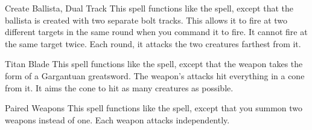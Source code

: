 \lowercase{\hypertarget{spell:Create Ballista, Dual Track}{}}\label{spell:Create Ballista, Dual Track}
\begin{ability}[\nth{4}]{\hypertarget{spell:Create Ballista, Dual Track}{Create Ballista, Dual Track}}
This spell functions like the  spell, except that the ballista is created with two separate bolt tracks.
This allows it to fire at two different targets in the same round when you command it to fire.
It cannot fire at the same target twice.
Each round, it attacks the two creatures farthest from it.
\end{ability}
\vspace{0.25em}



\lowercase{\hypertarget{spell:Titan Blade}{}}\label{spell:Titan Blade}
\begin{ability}[\nth{6}]{\hypertarget{spell:Titan Blade}{Titan Blade}}
This spell functions like the  spell, except that the weapon takes the form of a Gargantuan greatsword.
The weapon's attacks hit everything in a \areamed cone from it.
It aims the cone to hit as many creatures as possible.
\end{ability}
\vspace{0.25em}



\lowercase{\hypertarget{spell:Paired Weapons}{}}\label{spell:Paired Weapons}
\begin{ability}[\nth{7}]{\hypertarget{spell:Paired Weapons}{Paired Weapons}}
This spell functions like the  spell, except that you summon two weapons instead of one.
Each weapon attacks independently.
\end{ability}
\vspace{0.25em}

